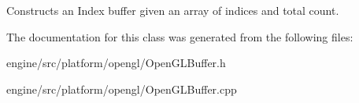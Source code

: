 Constructs an Index buffer given an array of indices and total count.

The documentation for this class was generated from the following files\+:\begin{DoxyCompactItemize}
\item
engine/src/platform/opengl/Open\+G\+L\+Buffer.\+h\item
engine/src/platform/opengl/Open\+G\+L\+Buffer.\+cpp\end{DoxyCompactItemize}
